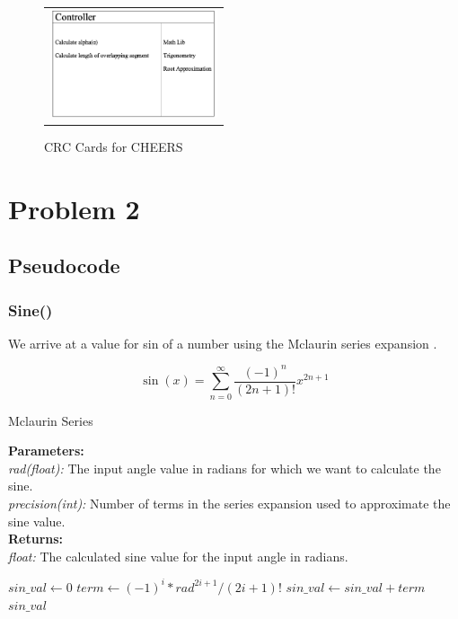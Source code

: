 \documentclass{report}
\begin{document}
\begin{figure}[h!]
        \begin{tabular}{@{}c@{}}
          \includegraphics[width=.4\linewidth,height=90pt]{resources/Controller.png}
        \end{tabular}

        \vspace{\floatsep}
      \caption{CRC Cards for CHEERS}\label{fig:myfig}
  \end{figure}

\chapter{Problem 2}
\section{Pseudocode}
  \subsection{Sine()}
    \begin{flushleft}
    We arrive at a value for sin of a number using the Mclaurin series expansion \cite{doi:10.1137/1021091}.
    \end{flushleft}
    $$\sin(x) = \sum_{n=0}^{\infty} \frac{(-1)^n}{(2n+1)!}x^{2n+1}$$

    \begin{algorithm}
      \caption{Mclaurin Series}\label{Sin of}
      \begin{tabbing}
        \textbf{Parameters:}\\
        \hspace{1em}\textit{rad(float):} The input angle value in radians for which we want to calculate the sine.\\
        \hspace{1em}\textit{precision(int):} Number of terms in the series expansion used to approximate the sine value.\\
        
        \textbf{Returns:}\\
          \hspace{1em}\textit{float:} The calculated sine value for the input angle in radians.\\
      \end{tabbing}
      \begin{algorithmic}[1]
          \State $sin\_val \gets 0$ 
           
              \State $term \gets (-1)^i * rad^{2i+1} / (2i+1)!$ 
              \State $sin\_val \gets sin\_val + term$ 
          \EndFor
          \State \Return $sin\_val$
      \EndFunction
      \end{algorithmic}
    \end{algorithm}
\end{document}
